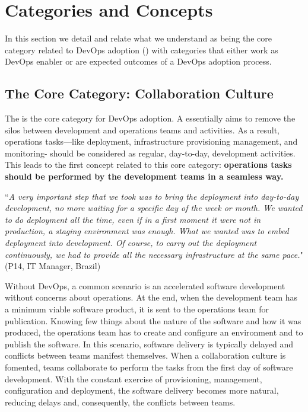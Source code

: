 \section{Categories and Concepts} \label{sec:categories_concepts}

In this section we detail and relate 
what we understand as being the core category
related to DevOps adoption ()  
with categories that either work as DevOps enabler or
are expected outcomes of a DevOps adoption process. 

\subsection{The Core Category: Collaboration Culture}

The  is the core category
for DevOps adoption. A  essentially aims to remove 
the silos between development and operations teams and activities.
As a result, operations tasks---like deployment, infrastructure provisioning 
management, and monitoring- should be considered as regular, day-to-day,
development activities. This leads to the first concept related to
this core category: {\bf operations tasks should be performed by
the development teams in a seamless way.}  

\begin{mq}
``\emph{A very important step that we took was to bring the deployment into day-to-day
development, no more waiting for a specific day of the week or month. We wanted
to do deployment all the time, even if in a first moment it were not in
production, a staging environment was enough. What we wanted was to embed
deployment into development. Of course, to carry out the deployment
continuously, we had to provide all the necessary infrastructure at the same
pace.}" (P14, IT Manager, Brazil)
\end{mq}

Without DevOps, a common scenario is an accelerated software development
without concerns about operations. At the end, when the development team has a
minimum viable software product, it is sent to the operations team for
publication. Knowing few things about the nature of the software and how it
was produced, the operations team has to create and configure an environment
and to publish the software. In this scenario, software delivery is typically
delayed and conflicts between teams manifest themselves. When a collaboration
culture is fomented, teams collaborate to perform the tasks from the first day
of software development. With the constant exercise of provisioning, management,
configuration and deployment, the software delivery becomes more natural,
reducing delays and, consequently, the conflicts between teams.

